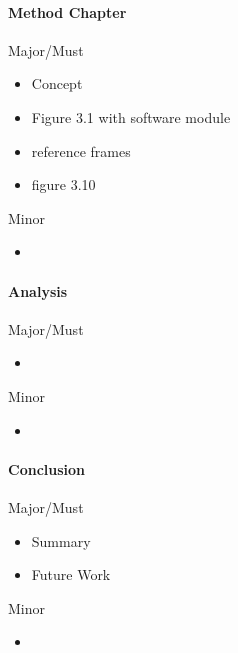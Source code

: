 \paragraph{Method Chapter}
Major/Must
\begin{itemize}
    \item Concept
    \item Figure 3.1 with software module
    \item reference frames
    \item figure 3.10
\end{itemize}
Minor
\begin{itemize}
    \item 
\end{itemize}

\paragraph{Analysis}
Major/Must
\begin{itemize}
    \item 
\end{itemize}
Minor
\begin{itemize}
    \item 
\end{itemize}

\paragraph{Conclusion}
Major/Must
\begin{itemize}
    \item Summary
    \item Future Work
\end{itemize}
Minor
\begin{itemize}
    \item 
\end{itemize}

